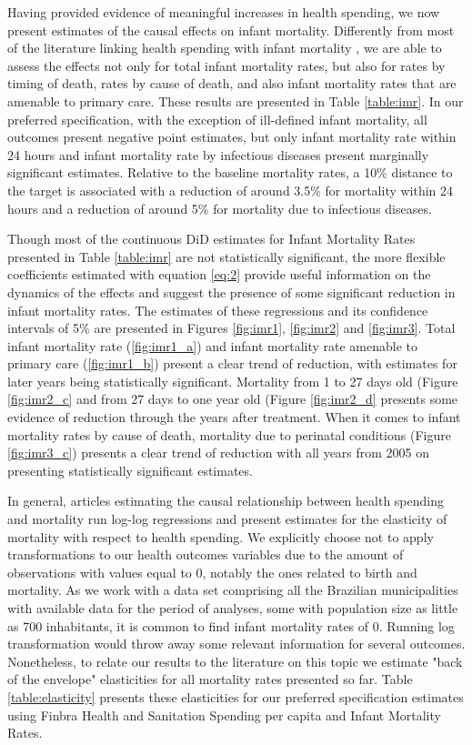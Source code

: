 Having provided evidence of meaningful increases in health spending, we now present estimates of the causal effects on infant mortality. Differently from most of the literature linking health spending with infant mortality \citep{filmer1999,bokhari2007,moreno2015,nixon2006,gupta2002effectiveness,cremieux1999,bokhari2007}, we are able to assess the effects not only for total infant mortality rates, but also for rates by timing of death, rates by cause of death, and also infant mortality rates that are amenable to primary care. These results are presented in Table \ref{table:imr}. In our preferred specification, with the exception of ill-defined infant mortality, all outcomes present negative point estimates, but only infant mortality rate within 24 hours and infant mortality rate by infectious diseases present marginally significant estimates. Relative to the baseline mortality rates, a 10\% distance to the target is associated with a reduction of around 3.5\% for mortality within 24 hours and a reduction of around 5\% for mortality due to infectious diseases. 

Though most of the continuous DiD estimates for Infant Mortality Rates presented in Table \ref{table:imr} are not statistically significant, the more flexible coefficients estimated with equation \ref{eq:2} provide useful information on the dynamics of the effects and suggest the presence of some significant reduction in infant mortality rates. The estimates of these regressions and its confidence intervals of 5\% are presented in Figures \ref{fig:imr1}, \ref{fig:imr2} and \ref{fig:imr3}. Total infant mortality rate (\ref{fig:imr1_a}) and infant mortality rate amenable to primary care (\ref{fig:imr1_b}) present a clear trend of reduction, with estimates for later years being statistically significant. Mortality from 1 to 27 days old (Figure \ref{fig:imr2_c} and from 27 days to one year old (Figure \ref{fig:imr2_d} presents some evidence of reduction through the years after treatment. When it comes to infant mortality rates by cause of death, mortality due to perinatal conditions (Figure \ref{fig:imr3_c}) presents a clear trend of reduction with all years from 2005 on presenting statistically significant estimates.

In general, articles estimating the causal relationship between health spending and mortality run log-log regressions and present estimates for the elasticity of mortality with respect to health spending. We explicitly choose not to apply transformations to our health outcomes variables due to the amount of observations with values equal to 0, notably the ones related to birth and mortality. As we work with a data set comprising all the Brazilian municipalities with available data for the period of analyses, some with population size as little as 700 inhabitants, it is common to find infant mortality rates of 0. Running log transformation would throw away some relevant information for several outcomes. Nonetheless, to relate our results to the literature on this topic we estimate "back of the envelope" elasticities for all mortality rates presented so far. Table \ref{table:elasticity} presents these elasticities for our preferred specification estimates using Finbra Health and Sanitation Spending per capita and Infant Mortality Rates. 

